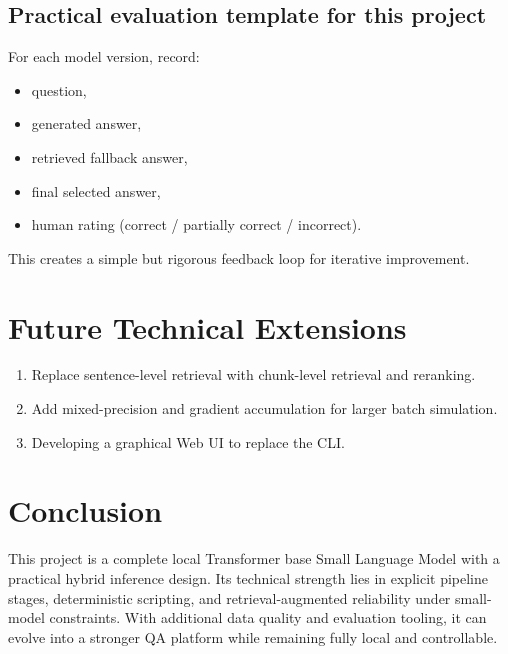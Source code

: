 \documentclass[a4paper,11pt]{article}
\begin{document}
\subsection{Practical evaluation template for this project}
For each model version, record:
\begin{itemize}[leftmargin=1.5em]
    \item question,
    \item generated answer,
    \item retrieved fallback answer,
    \item final selected answer,
    \item human rating (correct / partially correct / incorrect).
\end{itemize}

This creates a simple but rigorous feedback loop for iterative improvement.

\section{Future Technical Extensions}
\begin{enumerate}[leftmargin=1.5em]
    \item Replace sentence-level retrieval with chunk-level retrieval and reranking.
    \item Add mixed-precision and gradient accumulation for larger batch simulation.
    \item Developing a graphical Web UI to replace the CLI.
\end{enumerate}

\section{Conclusion}
This project is a complete local Transformer base Small Language Model with a practical hybrid inference design.
Its technical strength lies in explicit pipeline stages, deterministic scripting, and retrieval-augmented reliability under small-model constraints.
With additional data quality and evaluation tooling, it can evolve into a stronger QA platform while remaining fully local and controllable.
\end{document}
